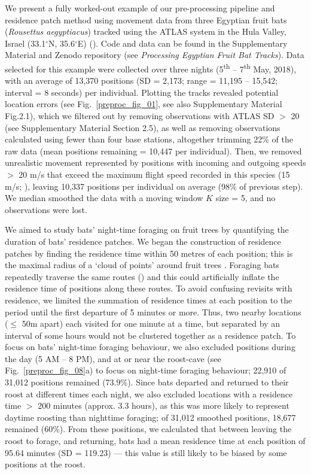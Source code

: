 We present a fully worked-out example of our pre-processing pipeline and residence patch method using movement data from three Egyptian fruit bats (\textit{Rousettus aegyptiacus}) tracked using the ATLAS system in the Hula Valley, Israel (33.1$^{\circ}$N, 35.6$^{\circ}$E) (\citealt{toledo2020, lourie2021}).
Code and data can be found in the Supplementary Material and Zenodo repository (see \textit{Processing Egyptian Fruit Bat Tracks}). 
Data selected for this example were collected over three nights (5\textsuperscript{th} -- 7\textsuperscript{th} May, 2018), with an average of 13,370 positions (SD = 2,173; range = 11,195 -- 15,542; interval = 8 seconds) per individual.
Plotting the tracks revealed potential location errors (see Fig.~\ref{preproc_fig_01}, see also Supplementary Material Fig.2.1), which we filtered out by removing observations with ATLAS SD $>$ 20 (see Supplementary Material Section 2.5), as well as removing observations calculated using fewer than four base stations, altogether trimming 22\% of the raw data (mean positions remaining = 10,447 per individual).
Then, we removed unrealistic movement represented by positions with incoming and outgoing speeds $>$ 20 m/s that exceed the maximum flight speed recorded in this species (15 m/s; \citealt{tsoar2011}), leaving 10,337 positions per individual on average (98\% of previous step).
We median smoothed the data with a moving window $K$ size = 5, and no observations were lost.

We aimed to study bats' night-time foraging on fruit trees by quantifying the duration of bats' residence patches.
We began the construction of residence patches by finding the residence time within 50 metres of each position; this is the maximal radius of a `cloud of points' around fruit trees \citep{bracis2018}.
Foraging bats repeatedly traverse the same routes (\citealt{toledo2020, tsoar2011, lourie2021}) and this could artificially inflate the residence time of positions along these routes.
To avoid confusing revisits with residence, we limited the summation of residence times at each position to the period until the first departure of 5 minutes or more.
Thus, two nearby locations ($\leq$ 50m apart) each visited for one minute at a time, but separated by an interval of some hours would not be clustered together as a residence patch. 
To focus on bats' night-time foraging behaviour, we also excluded positions during the day (5 AM -- 8 PM), and at or near the roost-cave (see Fig.~\ref{preproc_fig_08}a) to focus on night-time foraging behaviour; 22,910 of 31,012 positions remained (73.9\%).
Since bats departed and returned to their roost at different times each night, we also excluded locations with a residence time $>$ 200 minutes (approx. 3.3 hours), as this was more likely to represent daytime roosting than nighttime foraging; of 31,012 smoothed positions, 18,677 remained (60\%).
From these positions, we calculated that between leaving the roost to forage, and returning, bats had a mean residence time at each position of 95.64 minutes (SD = 119.23) --- this value is still likely to be biased by some positions at the roost.

